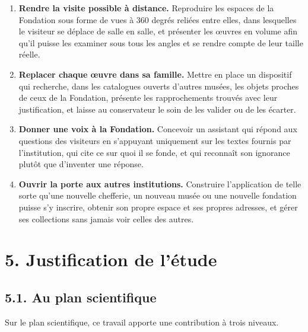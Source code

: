 \begin{enumerate}
  \item[\textbf{OS1.}] \textbf{Rendre la visite possible à distance.} Reproduire
        les espaces de la Fondation sous forme de vues à 360 degrés reliées
        entre elles, dans lesquelles le visiteur se déplace de salle en salle,
        et présenter les œuvres en volume afin qu'il puisse les examiner sous
        tous les angles et se rendre compte de leur taille réelle.

  \item[\textbf{OS2.}] \textbf{Replacer chaque œuvre dans sa famille.} Mettre en
        place un dispositif qui recherche, dans les catalogues ouverts d'autres
        musées, les objets proches de ceux de la Fondation, présente les
        rapprochements trouvés avec leur justification, et laisse au
        conservateur le soin de les valider ou de les écarter.

  \item[\textbf{OS3.}] \textbf{Donner une voix à la Fondation.} Concevoir un
        assistant qui répond aux questions des visiteurs en s'appuyant
        uniquement sur les textes fournis par l'institution, qui cite ce sur
        quoi il se fonde, et qui reconnaît son ignorance plutôt que d'inventer
        une réponse.

  \item[\textbf{OS4.}] \textbf{Ouvrir la porte aux autres institutions.}
        Construire l'application de telle sorte qu'une nouvelle chefferie, un
        nouveau musée ou une nouvelle fondation puisse s'y inscrire, obtenir son
        propre espace et ses propres adresses, et gérer ses collections sans
        jamais voir celles des autres.
\end{enumerate}

\section*{5. Justification de l'étude}

\subsection*{5.1. Au plan scientifique}

Sur le plan scientifique, ce travail apporte une contribution à trois niveaux.

